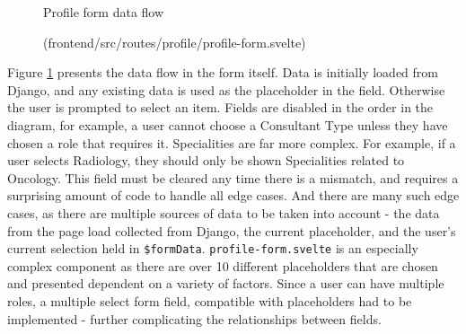 \begin{figure}[h]
\centering
{}
\vspace{-5pt}
\caption{Profile form data flow}
\vspace{-10pt}
\caption*{(frontend/src/routes/profile/profile-form.svelte)}
\label{fig:profile-form}
\vspace{-15pt}
\end{figure}

Figure \ref{fig:profile-form} presents the data flow in the form itself. Data is initially loaded from Django, and any existing data is used as the placeholder in the field. Otherwise the user is prompted to select an item. Fields are disabled in the order in the diagram, for example, a user cannot choose a Consultant Type unless they have chosen a role that requires it. Specialities are far more complex. For example, if a user selects Radiology, they should only be shown Specialities related to Oncology. This field must be cleared any time there is a mismatch, and requires a surprising amount of code to handle all edge cases. And there are many such edge cases, as there are multiple sources of data to be taken into account - the data from the page load collected from Django, the current placeholder, and the user's current selection held in \texttt{\$formData}. \texttt{profile-form.svelte} is an especially complex component as there are over 10 different placeholders that are chosen and presented dependent on a variety of factors. Since a user can have multiple roles, a multiple select form field, compatible with placeholders had to be implemented - further complicating the relationships between fields.

